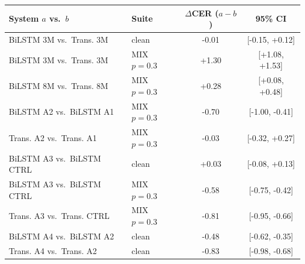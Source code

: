 \begin{tabular}{llcc}
\toprule
System $a$ vs.\ $b$ & Suite & $\Delta$CER ($a-b$) & 95\% CI \\
\midrule
BiLSTM 3M vs.\ Trans. 3M & clean & -0.01 & [-0.15, +0.12] \\
BiLSTM 3M vs.\ Trans. 3M & MIX $p{=}0.3$ & +1.30 & [+1.08, +1.53] \\
BiLSTM 8M vs.\ Trans. 8M & MIX $p{=}0.3$ & +0.28 & [+0.08, +0.48] \\
BiLSTM A2 vs.\ BiLSTM A1 & MIX $p{=}0.3$ & -0.70 & [-1.00, -0.41] \\
Trans. A2 vs.\ Trans. A1 & MIX $p{=}0.3$ & -0.03 & [-0.32, +0.27] \\
BiLSTM A3 vs.\ BiLSTM CTRL & clean & +0.03 & [-0.08, +0.13] \\
BiLSTM A3 vs.\ BiLSTM CTRL & MIX $p{=}0.3$ & -0.58 & [-0.75, -0.42] \\
Trans. A3 vs.\ Trans. CTRL & MIX $p{=}0.3$ & -0.81 & [-0.95, -0.66] \\
BiLSTM A4 vs.\ BiLSTM A2 & clean & -0.48 & [-0.62, -0.35] \\
Trans. A4 vs.\ Trans. A2 & clean & -0.83 & [-0.98, -0.68] \\
\bottomrule
\end{tabular}